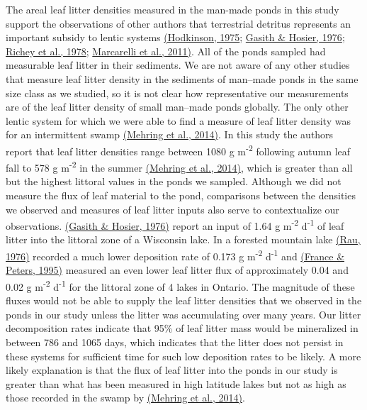 \documentclass[12pt,letter]{article}
\begin{document}
The areal leaf litter densities measured in the man-made ponds in this study support the observations of other authors that terrestrial detritus represents an important subsidy to lentic systems \hyperref[csl:5]{(Hodkinson, 1975}; \hyperref[csl:6]{Gasith \& Hosier, 1976}; \hyperref[csl:35]{Richey et al., 1978}; \hyperref[csl:4]{Marcarelli et al., 2011)}. All of the ponds sampled had measurable leaf litter in their sediments. We are not aware of any other studies that measure leaf litter density in the sediments of man--made ponds in the same size class as we studied, so it is not clear how representative our measurements are of the leaf litter density of small man--made ponds globally. The only other lentic system for which we were able to find a measure of leaf litter density was for an intermittent swamp \hyperref[csl:11]{(Mehring et al., 2014)}. In this study the authors report that leaf litter densities range between 1080 g m\textsuperscript{-2} following autumn leaf fall to 578 g m\textsuperscript{-2} in the summer \hyperref[csl:11]{(Mehring et al., 2014)}, which is greater than all but the highest littoral values in the ponds we sampled.  Although we did not measure the flux of leaf material to the pond, comparisons between the densities we observed and measures of leaf litter inputs also serve to contextualize our observations.  \hyperref[csl:6]{(Gasith \& Hosier, 1976)} report an input of 1.64 g m\textsuperscript{-2} d\textsuperscript{-1} of leaf litter into the littoral zone of a Wisconsin lake.  In a forested mountain lake \hyperref[csl:36]{(Rau, 1976)} recorded a much lower deposition rate of 0.173 g m\textsuperscript{-2} d\textsuperscript{-1} and \hyperref[csl:37]{(France \& Peters, 1995)} measured an even lower leaf litter flux of approximately 0.04 and 0.02 g m\textsuperscript{-2} d\textsuperscript{-1} for the littoral zone of 4 lakes in Ontario. The magnitude of these fluxes would not be able to supply the leaf litter densities that we observed in the ponds in our study unless the litter was accumulating over many years. Our litter decomposition rates indicate that 95\% of leaf litter mass would be mineralized in between 786 and 1065 days, which indicates that the litter does not persist in these systems for sufficient time for such low deposition rates to be likely. A more likely explanation is that the flux of leaf litter into the ponds in our study is greater than what has been measured in high latitude lakes but not as high as those recorded in the swamp by \hyperref[csl:11]{(Mehring et al., 2014)}.  
\end{document}
